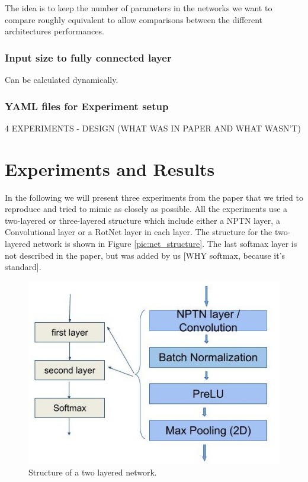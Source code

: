 \documentclass{llncs}
\begin{document}
The idea is to keep the number of parameters in the networks we want to compare roughly equivalent to allow comparisons between the different architectures performances.


\subsubsection{Input size to fully connected layer}
Can be calculated dynamically.
\subsubsection{YAML files for Experiment setup}

4 EXPERIMENTS
- DESIGN (WHAT WAS IN PAPER AND WHAT WASN'T)



\section{Experiments and Results}	
In the following we will present three experiments from the paper that we tried to reproduce and tried to mimic as closely as possible. 
All the experiments use a two-layered or three-layered structure which include either a NPTN layer, a Convolutional layer or a RotNet layer in each layer. The structure for the two-layered network is shown in Figure \ref{pic:net_structure}. The last softmax layer is not described in the paper, but was added by us [WHY softmax, because it's standard]. 

\begin{figure}
	\begin{center}
	\includegraphics[scale=0.35]{result_images/network_structure.jpg}
	\caption{Structure of a two layered network.}
	\label{pic:network_structure}
	\end{center}
\end{figure}
\end{document}
